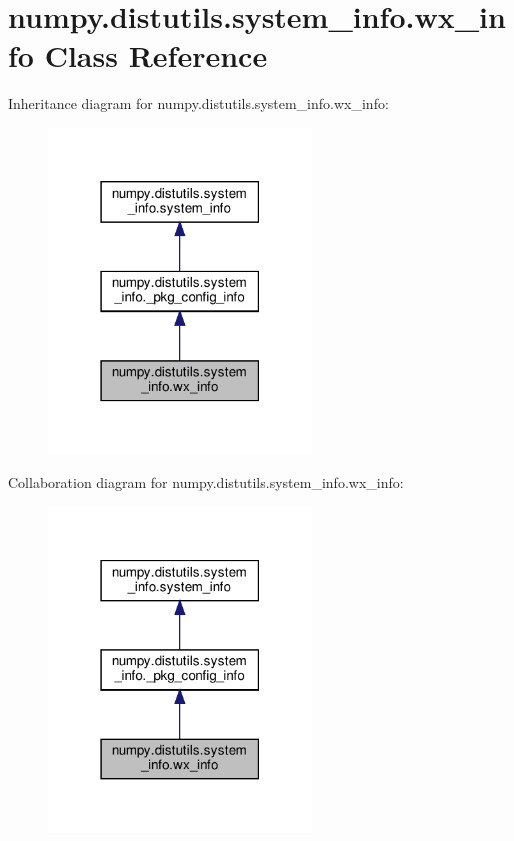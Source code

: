 \hypertarget{classnumpy_1_1distutils_1_1system__info_1_1wx__info}{}\section{numpy.\+distutils.\+system\+\_\+info.\+wx\+\_\+info Class Reference}
\label{classnumpy_1_1distutils_1_1system__info_1_1wx__info}


Inheritance diagram for numpy.\+distutils.\+system\+\_\+info.\+wx\+\_\+info\+:
\nopagebreak
\begin{figure}[H]
\begin{center}
\leavevmode
\includegraphics[width=198pt]{classnumpy_1_1distutils_1_1system__info_1_1wx__info__inherit__graph}
\end{center}
\end{figure}


Collaboration diagram for numpy.\+distutils.\+system\+\_\+info.\+wx\+\_\+info\+:
\nopagebreak
\begin{figure}[H]
\begin{center}
\leavevmode
\includegraphics[width=198pt]{classnumpy_1_1distutils_1_1system__info_1_1wx__info__coll__graph}
\end{center}
\end{figure}
